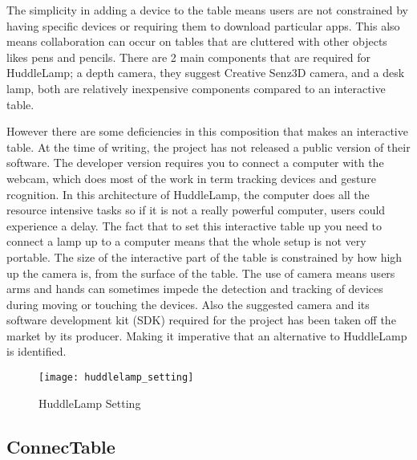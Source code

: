 The simplicity in adding a device to the table means users are not
constrained by having specific devices or requiring them to download
particular apps. This also means collaboration can occur on tables
that are cluttered with other objects likes pens and pencils. There
are 2 main components that are required for HuddleLamp;
a depth camera, they suggest Creative Senz3D\cite{creative-senz3d} camera, and a desk lamp, both
are relatively inexpensive components compared to an interactive table.

However there are some deficiencies in this composition that makes
an interactive table. At the time of writing, the project has not
released a public version of their software. The developer
version requires you to connect a computer with the webcam, which
does most of the work in term tracking devices and gesture rcognition. In this architecture
of HuddleLamp, the computer does all the resource intensive tasks so if it is
not a really powerful computer, users could experience a delay. The fact
that to set this interactive table up you need to connect a lamp up
to a computer means that the whole setup is not very portable. The
size of the interactive part of the table is constrained by how high
up the camera is, from the surface of the table. The use of camera
means users arms and hands can sometimes impede the
detection and tracking of devices during moving or touching the devices.
Also the suggested camera and its software development kit (SDK) required
for the project has been taken off the market by its producer. Making
it imperative that an alternative to HuddleLamp is identified.

\begin{figure}[H]
\centering
\texttt{[image: huddlelamp\_setting]}
\protect\caption{HuddleLamp Setting}
\end{figure}
\subsection{ConnecTable}


